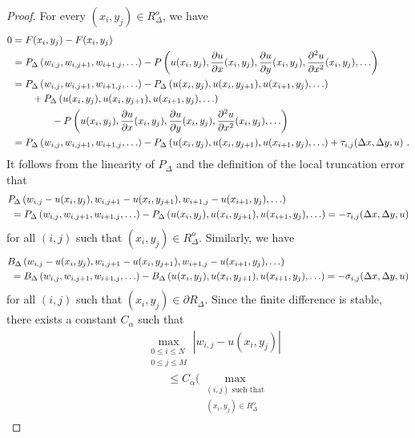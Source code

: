 \begin{proof}
For every $(x_i,y_j) \in R^o_\Delta$, we have
\begin{align*}
0 &= F(x_i,y_j) - F(x_i,y_j) \\
&= P_\Delta\left(w_{i,j}, w_{i,j+1}, w_{i+1,j}, \ldots\right) - 
P\left(u(x_i,y_j), \frac{\partial{u}}{\partial{x}}(x_i,y_j), \frac{\partial{u}}{\partial{y}}(x_i,y_j),
\frac{\partial^{2}{u}}{\partial{x}^{2}}(x_i,y_j), \ldots \right) \\
&= P_\Delta\left(w_{i,j}, w_{i,j+1}, w_{i+1,j}, \ldots\right) - 
P_\Delta\left(u(x_i,y_j), u(x_i,y_{j+1}), u(x_{i+1},y_j),\ldots \right) \\
&\qquad + P_\Delta\left(u(x_i,y_j), u(x_i,y_{j+1}),
  u(x_{i+1},y_j), \ldots \right) \\
&\qquad \qquad -
P\left(u(x_i,y_j), \frac{\partial{u}}{\partial{x}}(x_i,y_j), \frac{\partial{u}}{\partial{y}}(x_i,y_j),
\frac{\partial^{2}{u}}{\partial{x}^{2}}(x_i,y_j), \ldots \right) \\
&= P_\Delta\left(w_{i,j}, w_{i,j+1}, w_{i+1,j}, \ldots\right) - 
P_\Delta\left(u(x_i,y_j), u(x_i,y_{j+1}), u(x_{i+1},y_j),\ldots \right)
+ \tau_{i,j}(\Delta{x},\Delta{y},u) \ .
\end{align*}
It follows from the linearity of $P_\Delta$ and the definition of the
local truncation error that
\begin{align*}
&P_\Delta\left(w_{i,j}-u(x_i,y_j), w_{i,j+1}-u(x_i,y_{j+1}),
w_{i+1,j}-u(x_{i+1},y_j), \ldots\right) \\
&\ = P_\Delta\left(w_{i,j}, w_{i,j+1}, w_{i+1,j}, \ldots\right) - 
P_\Delta\left(u(x_i,y_j), u(x_i,y_{j+1}), u(x_{i+1},y_j),
  \ldots \right)  = - \tau_{i,j}(\Delta{x},\Delta{y},u)
\end{align*}
for all $(i,j)$ such that $(x_i,y_j) \in R^o_\Delta$.
Similarly, we have
\begin{align*}
&B_\Delta\left(w_{i,j}-u(x_i,y_j), w_{i,j+1}-u(x_i,y_{j+1}),
w_{i+1,j}-u(x_{i+1},y_j), \ldots\right) \\
&\ = B_\Delta\left(w_{i,j}, w_{i,j+1}, w_{i+1,j}, \ldots\right) - 
B_\Delta\left(u(x_i,y_j), u(x_i,y_{j+1}), u(x_{i+1},y_j),
  \ldots \right)  = - \sigma_{i,j}(\Delta{x},\Delta{y},u)
\end{align*}
for all $(i,j)$ such that $(x_i,y_j) \in \partial R_\Delta$.  Since
the finite difference is stable, there exists a constant $C_\alpha$ such that
\begin{align*}
&\max_{\substack{0\leq i\leq N\\0\leq j \leq M}} |w_{i,j} - u(x_i,y_j)| \\
&\qquad \leq C_\alpha \bigg(
\max_{\substack{(i,j) \text{ such that}\\(x_i,y_j)\in R^o_\Delta}}

\end{align*}
\end{proof}
